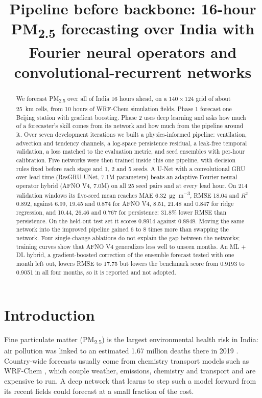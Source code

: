 \documentclass[conference]{IEEEtran}
\newcommand{\ugm}{\si{\micro\gram\per\cubic\metre}}
\newcommand{\PM}{PM\textsubscript{2.5}}
\begin{document}
\title{Pipeline before backbone: 16-hour \PM{} forecasting over India with Fourier neural operators and convolutional-recurrent networks}

\author{
}

\maketitle

\begin{abstract}
We forecast \PM{} over all of India 16 hours ahead, on a $140\times124$ grid of about 25~km cells, from 10 hours of WRF-Chem simulation fields. Phase 1 forecast one Beijing station with gradient boosting. Phase 2 uses deep learning and asks how much of a forecaster's skill comes from its network and how much from the pipeline around it. Over seven development iterations we built a physics-informed pipeline: ventilation, advection and tendency channels, a log-space persistence residual, a leak-free temporal validation, a loss matched to the evaluation metric, and seed ensembles with per-hour calibration. Five networks were then trained inside this one pipeline, with decision rules fixed before each stage and 1, 2 and 5 seeds. A U-Net with a convolutional GRU over lead time (ResGRU-UNet, 7.1M parameters) beats an adaptive Fourier neural operator hybrid (AFNO V4, 7.0M) on all 25 seed pairs and at every lead hour. On 214 validation windows its five-seed mean reaches MAE 6.32~\ugm, RMSE 18.04 and $R^2$ 0.892, against 6.99, 19.45 and 0.874 for AFNO V4, 8.51, 21.48 and 0.847 for ridge regression, and 10.44, 26.46 and 0.767 for persistence: 31.8\% lower RMSE than persistence. On the held-out test set it scores 0.8914 against 0.8848. Moving the same network into the improved pipeline gained 6 to 8 times more than swapping the network. Four single-change ablations do not explain the gap between the networks; training curves show that AFNO V4 generalizes less well to unseen months. An ML + DL hybrid, a gradient-boosted correction of the ensemble forecast tested with one month left out, lowers RMSE to 17.75 but lowers the benchmark score from 0.9193 to 0.9051 in all four months, so it is reported and not adopted.
\end{abstract}

\section{Introduction}
Fine particulate matter (\PM) is the largest environmental health risk in India: air pollution was linked to an estimated 1.67 million deaths there in 2019 \cite{pandey2021}. Country-wide forecasts usually come from chemistry transport models such as WRF-Chem \cite{grell2005}, which couple weather, emissions, chemistry and transport and are expensive to run. A deep network that learns to step such a model forward from its recent fields could forecast at a small fraction of the cost.
\end{document}
